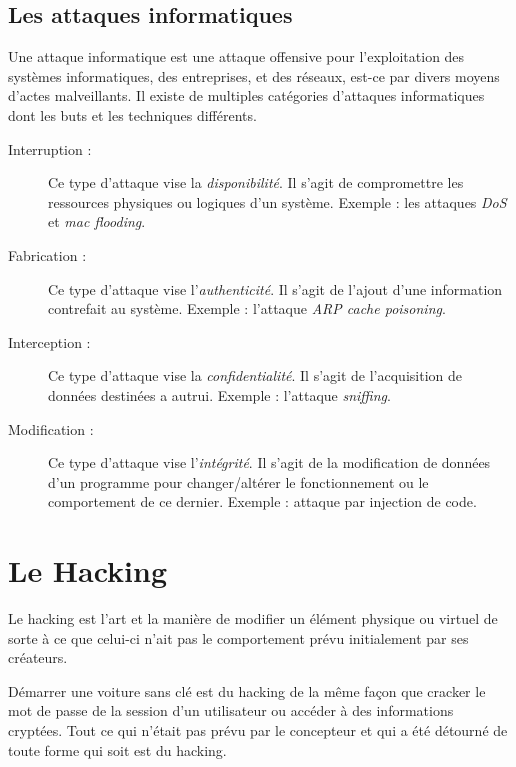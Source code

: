     \subsection{Les attaques informatiques}
    Une attaque informatique est une attaque offensive pour l’exploitation des systèmes informatiques, 
    des entreprises, et des réseaux, est-ce par divers moyens d’actes malveillants. 
    Il existe de multiples catégories d’attaques informatiques dont les buts et les techniques différents. %
    \begin{description}
        \item[Interruption :] Ce type d'attaque vise la \emph{disponibilité}. Il s’agit de compromettre les 
            ressources physiques ou logiques d'un système. Exemple : les attaques \emph{DoS} et \emph{mac flooding}.
        \item[Fabrication :] Ce type d’attaque vise l'\emph{authenticité}. Il s'agit de l’ajout d’une 
            information contrefait au système. Exemple : l'attaque \emph{ARP cache poisoning}. %
        \item[Interception :] Ce type d’attaque vise la \emph{confidentialité}. Il s’agit de l'acquisition de données 
            destinées a autrui. Exemple : l’attaque \emph{sniffing}. %
        \item[Modification :] Ce type d’attaque vise l'\emph{intégrité}. Il s’agit de la modification 
            de données d’un programme pour changer/altérer le fonctionnement ou le comportement de ce dernier. 
            Exemple : attaque par injection de code. %
    \end{description}
    
\section{Le Hacking}
    Le hacking \cite{bases_hacking} est l'art et la manière de modifier un élément physique ou virtuel 
    de sorte à ce que celui-ci n'ait pas le comportement prévu initialement par ses créateurs. %

    Démarrer une voiture sans clé est du hacking de la même façon que cracker le mot de passe de la session 
    d'un utilisateur ou accéder à des informations cryptées. Tout ce qui n'était pas prévu par le concepteur et 
    qui a été détourné de toute forme qui soit est du hacking. %

